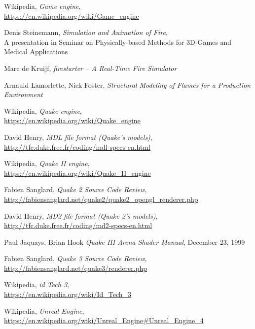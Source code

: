 \begin{thebibliography}{x}

  Wikipedia,
  \textit{Game engine}, \\
  \url{https://en.wikipedia.org/wiki/Game_engine}

  Denis Steinemann,
  \textit{Simulation and Animation of Fire}, \\
  A presentation in Seminar on Physically-based Methods for 3D-Games and Medical Applications
  
  Marc de Kruijf,
  \textit{firestarter – A Real-Time Fire Simulator}

 Arnauld Lamorlette, Nick Foster,
 \textit{Structural Modeling of Flames for a Production Environment}

 Wikipedia, 
 \textit{Quake engine},\\
 \url{https://en.wikipedia.org/wiki/Quake_engine}
 
 David Henry, 
 \textit{MDL file format (Quake's models)},\\
 \url{http://tfc.duke.free.fr/coding/mdl-specs-en.html}

 Wikipedia, 
 \textit{Quake II engine},\\
 \url{https://en.wikipedia.org/wiki/Quake_II_engine}

 Fabien Sanglard, 
 \textit{Quake 2 Source Code Review},\\
 \url{http://fabiensanglard.net/quake2/quake2_opengl_renderer.php}

 David Henry, 
 \textit{MD2 file format (Quake 2's models)},\\
 \url{http://tfc.duke.free.fr/coding/md2-specs-en.html}

  Paul Jaquays, Brian Hook
  \textit{Quake III Arena Shader Manual},
  December 23, 1999

  Fabien Sanglard, 
  \textit{Quake 3 Source Code Review},\\
  \url{http://fabiensanglard.net/quake3/renderer.php}

 Wikipedia, 
 \textit{id Tech 3},\\
 \url{https://en.wikipedia.org/wiki/Id_Tech_3}

 Wikipedia, 
 \textit{Unreal Engine},\\
 \url{https://en.wikipedia.org/wiki/Unreal_Engine#Unreal_Engine_4}


\end{thebibliography}

